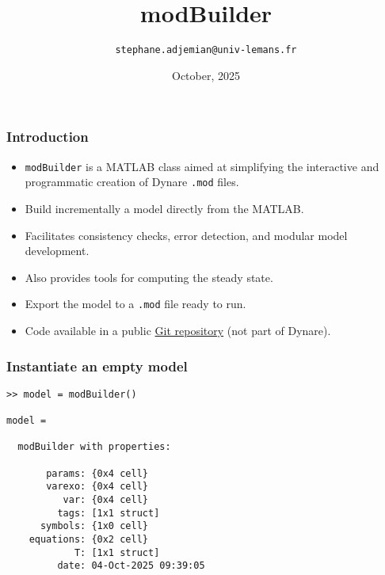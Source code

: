 \documentclass[10pt,slidestop]{beamer}
\theoremstyle{plain}
\begin{document}
\title{modBuilder}
\author[]{\texttt{stephane.adjemian@univ-lemans.fr}}
\date{October,  2025}

\begin{frame}
  \titlepage{}
\end{frame}

\begin{frame}[fragile]
  \frametitle{Introduction}

  \bigskip

  \begin{itemize}

  \item \verb+modBuilder+ is a MATLAB class aimed at simplifying the interactive and
    programmatic creation of Dynare \verb+.mod+ files.\newline

  \item Build incrementally a model directly from the MATLAB.\newline

  \item Facilitates consistency checks, error detection, and modular
    model development.\newline

  \item Also provides tools for computing the steady state.\newline

  \item Export the model to a \verb+.mod+ file ready to run.\newline

  \item Code available in a public \href{https://git.dynare.org/stepan-a/modbuilder}{Git repository} (not part of Dynare).

  \end{itemize}

\end{frame}


\begin{frame}[fragile]
  \frametitle{Instantiate an empty model}

\begin{lstlisting}[style=MatlabConsole]
>> model = modBuilder()

model =

  modBuilder with properties:

       params: {0x4 cell}
       varexo: {0x4 cell}
          var: {0x4 cell}
         tags: [1x1 struct]
      symbols: {1x0 cell}
    equations: {0x2 cell}
            T: [1x1 struct]
         date: 04-Oct-2025 09:39:05
   \end{lstlisting}

\end{frame}
\end{document}
